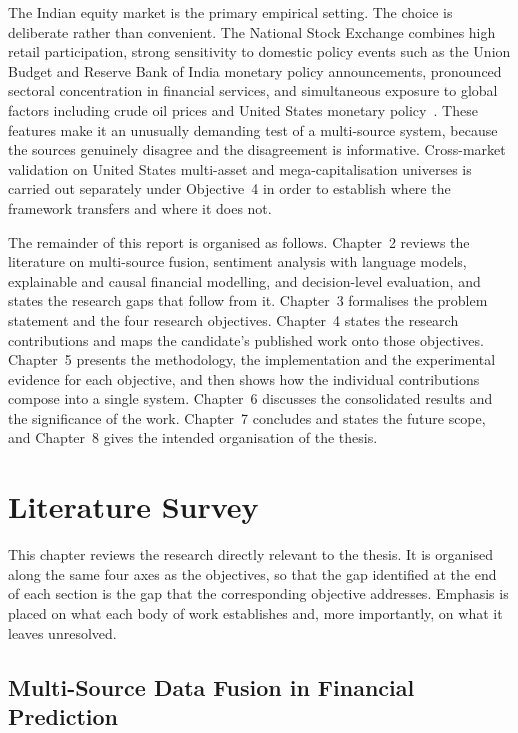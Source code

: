 The Indian equity market is the primary empirical setting. The choice is deliberate
rather than convenient. The National Stock Exchange combines high retail participation,
strong sensitivity to domestic policy events such as the Union Budget and Reserve Bank of
India monetary policy announcements, pronounced sectoral concentration in financial
services, and simultaneous exposure to global factors including crude oil prices and
United States monetary policy~\cite{mu2023investor,bacco2024}. These features make
it an unusually demanding test of a multi-source system, because the sources genuinely
disagree and the disagreement is informative. Cross-market validation on United States
multi-asset and mega-capitalisation universes is carried out separately under
Objective~4 in order to establish where the framework transfers and where it does not.

The remainder of this report is organised as follows. Chapter~2 reviews the literature
on multi-source fusion, sentiment analysis with language models, explainable and causal
financial modelling, and decision-level evaluation, and states the research gaps that
follow from it. Chapter~3 formalises the problem statement and the four research
objectives. Chapter~4 states the research contributions and maps the candidate's
published work onto those objectives. Chapter~5 presents the methodology, the
implementation and the experimental evidence for each objective, and then shows how the
individual contributions compose into a single system. Chapter~6 discusses the
consolidated results and the significance of the work. Chapter~7 concludes and states
the future scope, and Chapter~8 gives the intended organisation of the thesis.

\chapter{Literature Survey}

This chapter reviews the research directly relevant to the thesis. It is organised along
the same four axes as the objectives, so that the gap identified at the end of each
section is the gap that the corresponding objective addresses. Emphasis is placed on
what each body of work establishes and, more importantly, on what it leaves unresolved.

\section{Multi-Source Data Fusion in Financial Prediction}


